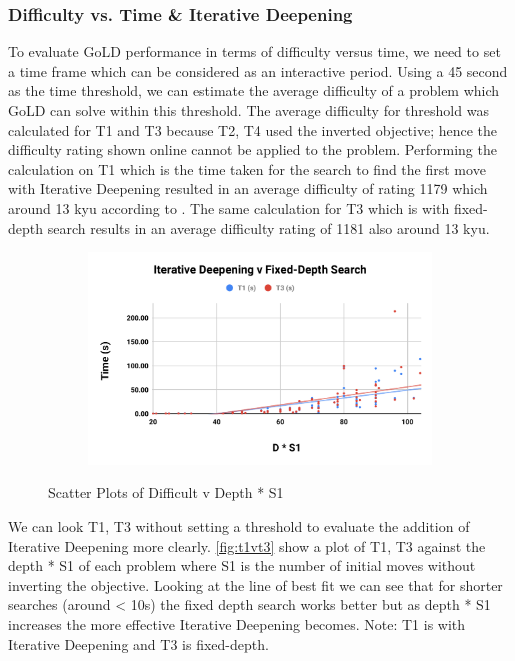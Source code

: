 \documentclass{l4proj}
\begin{document}
\subsubsection{Difficulty vs. Time \& Iterative Deepening}
To evaluate GoLD performance in terms of difficulty versus time, we need to set a time frame which can be considered as an interactive period. Using a 45 second as the time threshold, we can estimate the average difficulty of a problem which GoLD can solve within this threshold. The average difficulty for threshold was calculated for T1 and T3 because T2, T4 used the inverted objective; hence the difficulty rating shown online cannot be applied to the problem. Performing the calculation on T1 which is the time taken for the search to find the first move with Iterative Deepening resulted in an average difficulty of rating 1179 which around 13 kyu according to \cite{GoProblems}. The same calculation for T3 which is with fixed-depth search results in an average difficulty rating of 1181 also around 13 kyu.

\begin{figure}[!h]
\centering
\begin{subfigure}[b]{\textwidth}
\centering
\includegraphics[width=\textwidth]{edvd/t1vt3.pdf}
\end{subfigure}
\caption{Scatter Plots of Difficult v Depth * S1}
\label{fig:t1vt3}
\end{figure}




We can look T1, T3 without setting a threshold to evaluate the addition of Iterative Deepening more clearly. \autoref{fig:t1vt3} show a plot of T1, T3 against the depth * S1 of each problem where S1 is the number of initial moves without inverting the objective. Looking at the line of best fit we can see that for shorter searches (around < 10s) the fixed depth search works better but as depth * S1 increases the more effective Iterative Deepening becomes. Note: T1 is with Iterative Deepening and T3 is fixed-depth.
\end{document}
